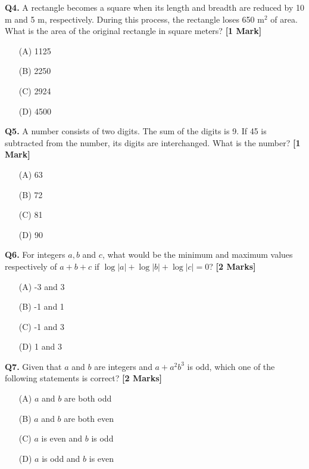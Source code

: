 \documentclass[11pt]{article}
\newcommand{\questiona}[2]{
    \noindent\textbf{Q#2.} #1 \hfill \textbf{[1 Mark]}
}
\newcommand{\questionb}[2]{
    \noindent\textbf{Q#2.} #1 \hfill \textbf{[2 Marks]}
}
\begin{document}
\questiona{A rectangle becomes a square when its length and breadth are reduced by 10 m and 5 m, respectively. During this process, the rectangle loses 650 m\(^2\) of area. What is the area of the original rectangle in square meters?}{4}
\begin{enumerate}
    \item[(A)] 1125
    \item[(B)] 2250
    \item[(C)] 2924
    \item[(D)] 4500
\end{enumerate}
\vspace{0.5cm}

\questiona{A number consists of two digits. The sum of the digits is 9. If 45 is subtracted from the number, its digits are interchanged. What is the number?}{5}
\begin{enumerate}
    \item[(A)] 63
    \item[(B)] 72
    \item[(C)] 81
    \item[(D)] 90
\end{enumerate}
\vspace{0.5cm}

\questionb{For integers \( a, b \) and \( c \), what would be the minimum and maximum values respectively of \( a + b + c \) if \( \log |a| + \log |b| + \log |c| = 0 \)?}{6}
\begin{enumerate}
    \item[(A)] -3 and 3
    \item[(B)] -1 and 1
    \item[(C)] -1 and 3
    \item[(D)] 1 and 3
\end{enumerate}
\vspace{0.5cm}

\questionb{Given that \( a \) and \( b \) are integers and \( a + a^2 b^3 \) is odd, which one of the following statements is correct?}{7}
\begin{enumerate}
    \item[(A)] \( a \) and \( b \) are both odd
    \item[(B)] \( a \) and \( b \) are both even
    \item[(C)] \( a \) is even and \( b \) is odd
    \item[(D)] \( a \) is odd and \( b \) is even
\end{enumerate}
\vspace{0.5cm}
\end{document}

